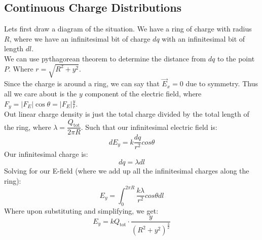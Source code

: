 \documentclass{article}
\begin{document}
\subsection{Continuous Charge Distributions}
\newpage
{}
\sol Lets first draw a diagram of the situation.
We have a ring of charge with radius $R$, where we have an infinitesimal bit of charge $dq$ with an infinitesimal bit of length $dl$.
\\ We can use pythagorean theorem to determine the distance from $dq$ to the point $P$. Where $r = \sqrt{R^2 + y^2}$.
\\ Since the charge is around a ring, we can say that $\vec{E}_x = 0$ due to symmetry. Thus all we care about is the $y$ component of the electric field, where $F_y = |F_E|\cos\theta = |F_E|\frac{y}{r}$.
\\ Out linear charge density is just the total charge divided by the total length of the ring, where $\lambda = \dfrac{Q_{\text{tot}}}{2\pi R}$.
\double Such that our infinitesimal electric field is:
$$ dE_y = k \dfrac{dq}{r^2} cos\theta$$
Our infinitesimal charge is:
$$ dq = \lambda dl $$
Solving for our E-field (where we add up all the infinitesimal charges along the ring):
$$ E_y = \int_0^{2\pi R} \dfrac{k \lambda}{r^2} cos\theta dl $$
Where upon substituting and simplifying, we get:
$$ \boxed{E_y = k Q_{\text{tot}} \cdot \dfrac{y}{(R^2 +y^2)^{\frac{3}{2}}}} $$
\end{document}
